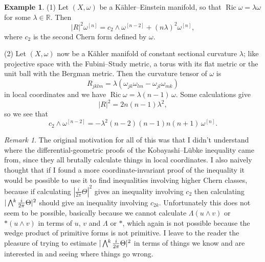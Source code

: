 \documentclass[11pt,a4paper]{amsart}
\def\^#1{^{[#1]}}
\def\bw#1{\bigwedge{}^{\mkern-5mu #1}\mkern2mu}
\DeclareMathOperator{\Ric}{Ric}
\def\RR{\mathbb{R}}
\def\curv{\frac{i}{2\pi} \Theta}
\theoremstyle{definition}
\newtheorem{exam}[theo]{Example}
\theoremstyle{remark}
\newtheorem*{rema}{Remark}
\numberwithin{equation}{section}
\begin{document}
\begin{exam}
(1) Let $(X,\omega)$ be a K\"ahler--Einstein manifold, so that $\Ric \omega
= \lambda \omega$ for some $\lambda \in \RR$. Then%
$$
\lvert R \rvert^2 \omega\^n
= c_2 \wedge \omega\^{n-2} + (n \lambda)^2 \omega\^n,
$$
where $c_2$ is the second Chern form defined by $\omega$.

\smallskip
(2) Let $(X,\omega)$ now be a K\"ahler manifold of constant sectional
curvature $\lambda$; like projective space with the Fubini--Study
metric, a torus with its flat metric or the unit ball with the Bergman
metric. Then the curvature tensor of $\omega$ is
$$
R_{jklm} = \lambda(\omega_{jk}\omega_{lm} - \omega_{jl}\omega_{mk})
$$
in local coordinates and we have $\Ric \omega =
\lambda(n-1)\,\omega$. Some calculations give
$$
|R|^2 
= 2n(n-1) \lambda^2,
$$
so we see that
$$
c_2 \wedge \omega\^{n-2}
= -\lambda^2(n-2)(n-1)n(n+1)\,\omega\^n.
$$
\end{exam}


\begin{rema}
The original motivation for all of this was that I didn't understand
where the differential-geometric proofs of the Kobayashi--L\"{u}bke
inequality came from, since they all brutally calculate things in local
coordinates. I also naively thought that if I found a more
coordinate-invariant proof of the inequality it would be possible to
use it to find inequalities involving higher Chern classes, because if
calculating $|\curv|^2$ gives an inequality involving $c_2$ then
calculating $|\bw{k}\curv|^2$ should give an inequality involving
$c_{2k}$. Unfortunately this does not seem to be possible, basically
because we cannot calculate $\Lambda(u \wedge v)$ or $*(u \wedge v)$
in terms of $u$, $v$ and $\Lambda$ or $*$, which again is not possible
because the wedge product of primitive forms is not primitive. I leave to
the reader the pleasure of trying to estimate $|\bw{k}\curv|^2$ in terms of
things we know and are interested in and seeing where things go wrong.
\end{rema}





\end{document}
